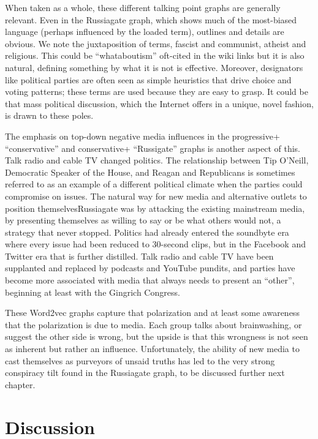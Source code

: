 \documentclass[doublespacing]{utdthesis}
\begin{document}
When taken as a whole, these different talking point graphs are generally relevant.
Even in the Russiagate graph, which shows much of the most-biased language (perhaps influenced by the loaded term), outlines and details are obvious.
We note the juxtaposition of terms, fascist and communist, atheist and religious.
This could be ``whataboutism'' oft-cited in the wiki links but it is also natural,
defining something by what it is not is effective.
Moreover, designators like political parties are often seen as simple heuristics that drive choice and voting patterns; these terms are used because they are easy to grasp.
It could be that mass political discussion, which the Internet offers in a unique, novel fashion, is drawn to these poles.

The emphasis on top-down negative media influences in the progressive+ ``conservative'' and conservative+ ``Russigate'' graphs is another aspect of this.
Talk radio and cable TV changed politics.
The relationship between Tip O'Neill, Democratic Speaker of the House, and Reagan and Republicans is sometimes referred to as an example of a different political climate when the parties could compromise on issues.
The natural way for new media and alternative outlets to position themselvesRussiagate was by attacking the existing mainstream media, by presenting themselves as willing to say or be what others would not, a strategy that never stopped.
Politics had already entered the soundbyte era where every issue had been reduced to 30-second clips, but in the Facebook and Twitter era that is further distilled.
Talk radio and cable TV have been supplanted and replaced by podcasts and YouTube pundits, and parties have become more associated with media that always needs to present an ``other'', beginning at least with the Gingrich Congress.

These Word2vec graphs capture that polarization and at least some awareness that the polarization is due to media.
Each group talks about brainwashing, or suggest the other side is wrong, but the upside is that this wrongness is not seen as inherent but rather an influence.
Unfortunately, the ability of new media to cast themselves as purveyors of unsaid truths has led to the very strong conspiracy tilt found in the Russiagate graph, to be discussed further next chapter.

\section{Discussion}
\end{document}
